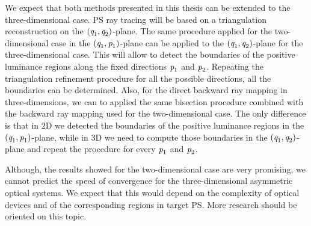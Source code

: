 
We expect that both methods presented in this thesis can be extended to the three-dimensional case. PS ray tracing will be based on a triangulation reconstruction on the $(\textit{q}_1, \textit{q}_2)$-plane. The same procedure applied for the two-dimensional case in the $(\textit{q}_1, \textit{p}_1)$-plane can be applied to the $(\textit{q}_1, \textit{q}_2)$-plane for the three-dimensional case. This will allow to detect the boundaries of the positive luminance regions along the fixed directions $\textit{p}_1$ and $\textit{p}_2$. Repeating the triangulation refinement procedure for all the possible directions, all the boundaries can be determined. Also, for the direct backward ray mapping in three-dimensions, we can to applied the same bisection procedure combined with the backward ray mapping used for the two-dimensional case. The only difference is that in $2$D we detected the boundaries of the positive luminance regions in the $(\textit{q}_1, \textit{p}_1)$-plane, while in $3$D we need to compute those boundaries in the $(\textit{q}_1, \textit{q}_2)$-plane and repeat the procedure for every $\textit{p}_1$ and $\textit{p}_2$.

Although, the results showed for the two-dimensional case are very promising, we cannot predict the speed of convergence for the three-dimensional asymmetric optical systems. We expect that this would depend on the complexity of optical devices and of the corresponding regions in target PS. More research should be oriented on this topic.

